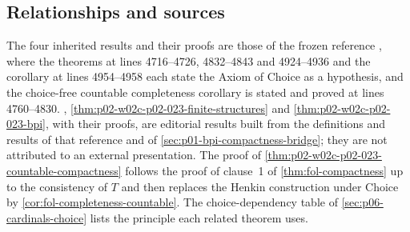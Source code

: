 \subsection{Relationships and sources}
\label{sec:p02-w02c-p02-023-sources}

The four inherited results and their proofs are those of the frozen
reference \cite[lines 4713--4967, sections ``Completeness'' and
``Compactness'']{FrozenFormalLogicCompactnessApplications}, where the
theorems at lines 4716--4726, 4832--4843 and 4924--4936 and the corollary at
lines 4954--4958 each state the Axiom of Choice as a hypothesis, and the
choice-free countable completeness corollary is stated and proved at lines
4760--4830.  ,
\cref{thm:p02-w02c-p02-023-finite-structures} and
\cref{thm:p02-w02c-p02-023-bpi}, with their proofs, are editorial results
built from the definitions and results of that reference and of
\cref{sec:p01-bpi-compactness-bridge}; they are not attributed to an
external presentation.  The proof of
\cref{thm:p02-w02c-p02-023-countable-compactness} follows the proof of
clause~1 of \cref{thm:fol-compactness} up to the consistency of \(T\) and then
replaces the Henkin construction under Choice by
\cref{cor:fol-completeness-countable}.  The choice-dependency table of
\cref{sec:p06-cardinals-choice} lists the principle each related theorem
uses.
